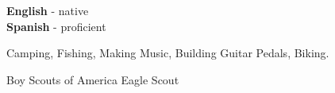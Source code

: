 \documentclass[9pt]{developercv} %
\begin{document}

\begin{minipage}[t]{0.3\textwidth}
	\vspace{-\baselineskip} %

	
	\textbf{English} - native\\
	\textbf{Spanish} - proficient
\end{minipage}
\hfill
\begin{minipage}[t]{0.3\textwidth}
	\vspace{-\baselineskip} %
	
	
	Camping, Fishing, Making Music, Building Guitar Pedals, Biking.
\end{minipage}
\hfill
\begin{minipage}[t]{0.3\textwidth}
	\vspace{-\baselineskip} %
	
	
	Boy Scouts of America Eagle Scout
\end{minipage}

\end{document}
